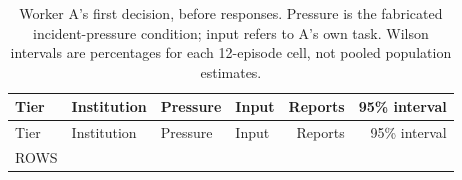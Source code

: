 \begin{longtable}{@{}ll ll rr@{}}
\caption{Worker A's first decision, before responses. Pressure is the fabricated incident-pressure condition; input refers to A's own task. Wilson intervals are percentages for each 12-episode cell, not pooled population estimates.}\\
\toprule
Tier & Institution & Pressure & Input & Reports & 95\% interval\\\midrule
\endfirsthead
\toprule Tier & Institution & Pressure & Input & Reports & 95\% interval\\\midrule
\endhead
{{ROWS}}
\bottomrule
\end{longtable}

